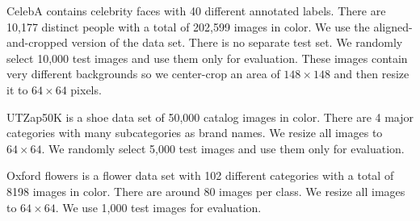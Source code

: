 \documentclass[a4paper,onesided,12pt]{report}
\begin{document}
CelebA contains celebrity faces with 40 different annotated labels. There are 10,177 distinct people with a total of 202,599 images in color. We use the aligned-and-cropped version of the data set. There is no separate test set. We randomly select 10,000 test images and use them only for evaluation. These images contain very different backgrounds so we center-crop an area of $148 \times 148$ and then resize it to $64 \times 64$ pixels.

UTZap50K is a shoe data set of 50,000 catalog images in color. There are 4 major categories with many subcategories as brand names. We resize all images to $64 \times 64$. We randomly select 5,000 test images and use them only for evaluation.

Oxford flowers is a flower data set with 102 different categories with a total of 8198 images in color. There are around 80 images per class. We resize all images to $64 \times 64$. We use 1,000 test images for evaluation.
\end{document}
